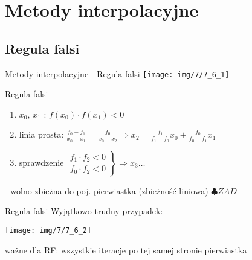 \section{Metody interpolacyjne}
\subsection{Regula falsi}
\begin{frame}{Metody interpolacyjne - Regula falsi}
	\centering   \texttt{[image: img/7/7\_6\_1]}
\end{frame}
\begin{frame}{Regula falsi}
	\begin{enumerate}
		\item $x_{0}$, $x_{1}$ : $f(x_{0}) \cdot f(x_{1}) < 0$
		
		\item linia prosta: $\frac{f_{0} - f_{1}}{x_{0} - x_{1}} = \frac{f_{0}}{x_{0} - x_{2}} \Rightarrow x_{2} = \frac{f_{1}}{f_{1} - f_{0}} x_{0} + \frac{f_{0}}{f_{0} - f_{1}}x_{1}$
		
		\item sprawdzenie 	$\left. \begin{array}{ll}
								f_{1} \cdot f_{2} < 0\\
								f_{0} \cdot f_{2} < 0
							\end{array}\right\} \Rightarrow x_{3} \ldots$\\
	\end{enumerate}
	- wolno zbieżna do poj. pierwiastka (zbieżność liniowa) \quad $\clubsuit ZAD$
\end{frame}
\begin{frame}{Regula falsi}
	Wyjątkowo trudny przypadek:\linebreak
	\begin{center}
		\texttt{[image: img/7/7\_6\_2]}
	\end{center}
	ważne dla RF: wszystkie iteracje po tej samej stronie pierwiastka
\end{frame}

